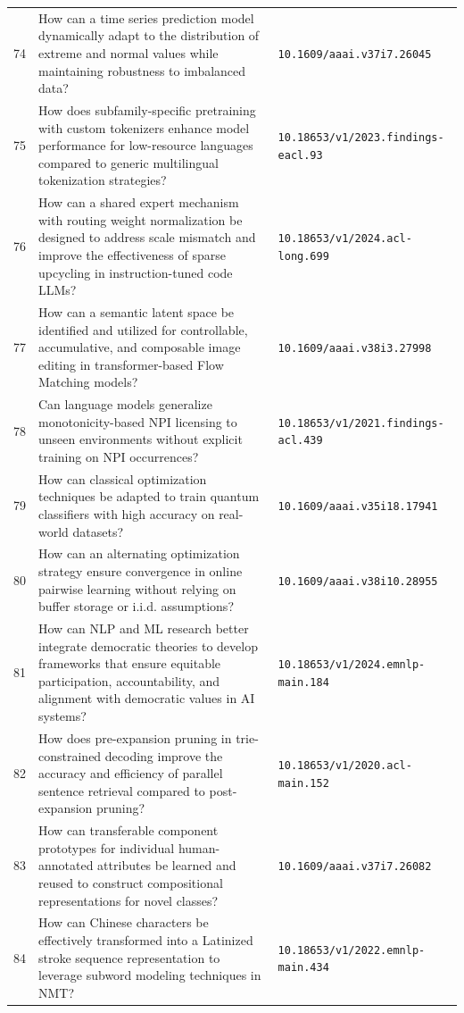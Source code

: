 \documentclass[runningheads]{llncs}
\begin{document}
\begin{longtable}{@{}p{0.5cm}p{7.2cm}p{2.5cm}@{}}
74 & How can a time series prediction model dynamically adapt to the distribution of extreme and normal values while maintaining robustness to imbalanced data? & \texttt{10.1609/aaai.v37i7.26045} \\
75 & How does subfamily-specific pretraining with custom tokenizers enhance model performance for low-resource languages compared to generic multilingual tokenization strategies? & \texttt{10.18653/v1/2023.findings-eacl.93} \\
76 & How can a shared expert mechanism with routing weight normalization be designed to address scale mismatch and improve the effectiveness of sparse upcycling in instruction-tuned code LLMs? & \texttt{10.18653/v1/2024.acl-long.699} \\
77 & How can a semantic latent space be identified and utilized for controllable, accumulative, and composable image editing in transformer-based Flow Matching models? & \texttt{10.1609/aaai.v38i3.27998} \\
78 & Can language models generalize monotonicity-based NPI licensing to unseen environments without explicit training on NPI occurrences? & \texttt{10.18653/v1/2021.findings-acl.439} \\
79 & How can classical optimization techniques be adapted to train quantum classifiers with high accuracy on real-world datasets? & \texttt{10.1609/aaai.v35i18.17941} \\
80 & How can an alternating optimization strategy ensure convergence in online pairwise learning without relying on buffer storage or i.i.d. assumptions? & \texttt{10.1609/aaai.v38i10.28955} \\
81 & How can NLP and ML research better integrate democratic theories to develop frameworks that ensure equitable participation, accountability, and alignment with democratic values in AI systems? & \texttt{10.18653/v1/2024.emnlp-main.184} \\
82 & How does pre-expansion pruning in trie-constrained decoding improve the accuracy and efficiency of parallel sentence retrieval compared to post-expansion pruning? & \texttt{10.18653/v1/2020.acl-main.152} \\
83 & How can transferable component prototypes for individual human-annotated attributes be learned and reused to construct compositional representations for novel classes? & \texttt{10.1609/aaai.v37i7.26082} \\
84 & How can Chinese characters be effectively transformed into a Latinized stroke sequence representation to leverage subword modeling techniques in NMT? & \texttt{10.18653/v1/2022.emnlp-main.434} \\

\end{longtable}
\end{document}
